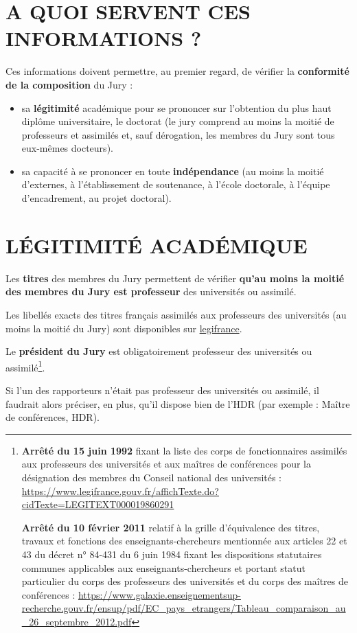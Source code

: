 \documentclass[main=french,a4paper]{book}
\begin{document}
\section{A QUOI SERVENT CES INFORMATIONS ?}
Ces informations doivent permettre, au premier regard, de vérifier la \textbf{conformité de la composition} du Jury :

\begin{itemize}
\renewcommand{\labelitemi}{$\bullet$}
    \item sa \textbf{légitimité} académique pour se prononcer sur l’obtention du plus haut diplôme universitaire, le doctorat (le jury comprend au moins la moitié de professeurs et assimilés et, sauf dérogation, les membres du Jury sont tous eux-mêmes docteurs). 
    \item sa capacité à se prononcer en toute \textbf{indépendance} (au moins la moitié d’externes, à l’établissement de soutenance, à l’école doctorale, à l’équipe d’encadrement, au projet doctoral).
\end{itemize}

\section{LÉGITIMITÉ ACADÉMIQUE}
Les \textbf{titres}  des membres du Jury permettent de vérifier \textbf{qu’au moins la moitié des membres du Jury est professeur} des universités ou assimilé.\\ \par
Les libellés exacts des titres français assimilés aux professeurs des universités (au moins la moitié du Jury) sont disponibles sur \href{https://www.legifrance.gouv.fr/loda/id/LEGITEXT000019860291/}{legifrance}.\\ \par
Le \textbf{président du Jury} est obligatoirement professeur des universités ou assimilé\footnote{\textbf{Arrêté du 15 juin 1992} fixant la liste des corps de fonctionnaires assimilés aux professeurs des universités et aux maîtres de conférences pour la désignation des membres du Conseil national des universités : \url{https://www.legifrance.gouv.fr/affichTexte.do?cidTexte=LEGITEXT000019860291}\\ \par
\textbf{Arrêté du 10 février 2011} relatif à la grille d'équivalence des titres, travaux et fonctions des enseignants-chercheurs mentionnée aux articles 22 et 43 du décret n° 84-431 du 6 juin 1984 fixant les dispositions statutaires communes applicables aux enseignants-chercheurs et portant statut particulier du corps des professeurs des universités et du corps des maîtres de conférences : \url{https://www.galaxie.enseignementsup-recherche.gouv.fr/ensup/pdf/EC_pays_etrangers/Tableau_comparaison_au_26_septembre_2012.pdf}}.\\ \par
Si l’un des rapporteurs n’était pas professeur des universités ou assimilé, il faudrait alors préciser, en plus, qu’il dispose bien de l’HDR (par exemple : Maître de conférences, HDR).
\end{document}
